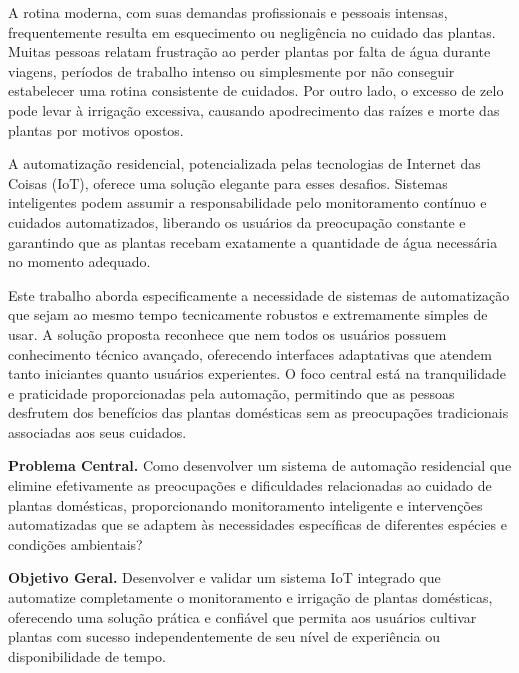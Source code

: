 \documentclass[twoside,english,brazilian]{UNISINOSmonografia}
\begin{document}
A rotina moderna, com suas demandas profissionais e pessoais intensas, frequentemente resulta em esquecimento ou negligência no cuidado das plantas. Muitas pessoas relatam frustração ao perder plantas por falta de água durante viagens, períodos de trabalho intenso ou simplesmente por não conseguir estabelecer uma rotina consistente de cuidados. Por outro lado, o excesso de zelo pode levar à irrigação excessiva, causando apodrecimento das raízes e morte das plantas por motivos opostos.

A automatização residencial, potencializada pelas tecnologias de Internet das Coisas (IoT), oferece uma solução elegante para esses desafios. Sistemas inteligentes podem assumir a responsabilidade pelo monitoramento contínuo e cuidados automatizados, liberando os usuários da preocupação constante e garantindo que as plantas recebam exatamente a quantidade de água necessária no momento adequado.

Este trabalho aborda especificamente a necessidade de sistemas de automatização que sejam ao mesmo tempo tecnicamente robustos e extremamente simples de usar. A solução proposta reconhece que nem todos os usuários possuem conhecimento técnico avançado, oferecendo interfaces adaptativas que atendem tanto iniciantes quanto usuários experientes. O foco central está na tranquilidade e praticidade proporcionadas pela automação, permitindo que as pessoas desfrutem dos benefícios das plantas domésticas sem as preocupações tradicionais associadas aos seus cuidados.

\medskip
\noindent\textbf{Problema Central.} Como desenvolver um sistema de automação residencial que elimine efetivamente as preocupações e dificuldades relacionadas ao cuidado de plantas domésticas, proporcionando monitoramento inteligente e intervenções automatizadas que se adaptem às necessidades específicas de diferentes espécies e condições ambientais?

\medskip
\noindent\textbf{Objetivo Geral.} Desenvolver e validar um sistema IoT integrado que automatize completamente o monitoramento e irrigação de plantas domésticas, oferecendo uma solução prática e confiável que permita aos usuários cultivar plantas com sucesso independentemente de seu nível de experiência ou disponibilidade de tempo.
\end{document}
